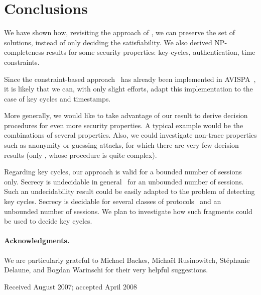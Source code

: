 \documentclass[acmtocl,acmnow]{acmtrans2m}
\newcommand{\avispa}{AVISPA}
\begin{document}
\section{Conclusions}\label{sec:conclusion}

We have shown how, revisiting the approach of \cite{CS03,RT03TCS}, we
can preserve the set of solutions, instead of only deciding the satisfiability.
We also derived  NP-completeness results for some security properties:
key-cycles, authentication, time constraints. 

Since the constraint-based approach~\cite{CS03,RT03TCS} has
already been implemented in \avispa~\cite{avispa2005}, it is likely that
we can, with only slight efforts, 
adapt this implementation to the case of key cycles and timestamps.

More generally, we would like to take advantage of our result to derive
decision procedures for even more security properties. A typical example
would be the combinations of several properties. Also, we could investigate
non-trace properties such as anonymity or guessing attacks, for which
there are very few decision results (only \cite{BaudetCCS05}, whose procedure
is quite complex). 










Regarding key cycles, our approach is valid for a bounded number of
sessions only. Secrecy is undecidable in
general~\cite{durgin04undecidability} for an unbounded number of
sessions. Such an undecidability result could be easily adapted to the
problem of detecting key cycles.  Secrecy is decidable
for several classes of protocols~\cite{RS03,rta03,blanchetTag03,VermaCade05} 
and an unbounded number of sessions. We plan to investigate how such
fragments could be used to decide key cycles.

\paragraph{Acknowledgments.} We are particularly grateful to Michael Backes, Micha\"el
Rusinowitch, St\'ephanie Delaune, and Bogdan Warinschi for their very helpful  suggestions.











\begin{received}
Received August 2007;
accepted April 2008
\end{received}
\end{document}

